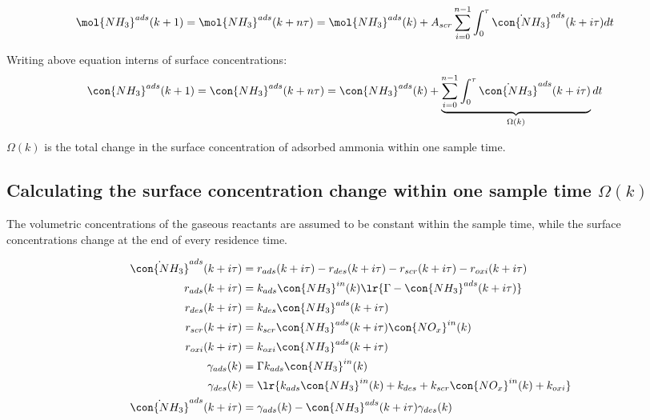 \begin{align}
    \mol{NH_3}^{ads}(k + 1) = \mol{NH_3}^{ads} (k + n\tau) &= \mol{NH_3}^{ads} (k) + A_{scr} \sum_{i=0}^{n-1} \int_{0}^{\tau} \dot{\con{NH_3}}^{ads} (k + i\tau) dt
\end{align}

Writing above equation interns of surface concentrations:
\begin{align}
    \con{NH_3}^{ads}(k + 1) = \con{NH_3}^{ads} (k + n\tau) &= \con{NH_3}^{ads} (k) + \underbrace{\sum_{i=0}^{n-1} \int_{0}^{\tau} \dot{\con{NH_3}}^{ads} (k + i\tau)}_{\Omega(k)}   dt
\end{align}

$\Omega(k)$ is the total change in the surface concentration of adsorbed ammonia
within one sample time.

\subsection{Calculating the surface concentration change within one sample time $\Omega(k)$}

The volumetric concentrations of the gaseous reactants are assumed to be
constant within the sample time, while the surface concentrations change at the
end of every residence time.

\begin{align*}
    \dot{\con{NH_3}}^{ads} (k + i\tau) &= r_{ads} (k + i \tau) - r_{des} (k + i \tau) - r_{scr} (k + i \tau) - r_{oxi} (k + i \tau)\\
    r_{ads} (k + i \tau) &= k_{ads} \con{NH_3}^{in}(k) \lr{\Gamma - \con{NH_3}^{ads} (k + i \tau)}\\
    r_{des} (k + i \tau) &= k_{des} \con{NH_3}^{ads}(k + i \tau)\\
    r_{scr} (k + i \tau) &= k_{scr} \con{NH_3}^{ads}(k + i \tau) \con{NO_x}^{in}(k)\\
    r_{oxi} (k + i \tau) &= k_{oxi} \con{NH_3}^{ads}(k + i \tau)\\
    \gamma_{ads} (k) &= \Gamma k_{ads} \con{NH_3}^{in}(k)\\
    \gamma_{des} (k) &= \lr{k_{ads} \con{NH_3}^{in}(k) + k_{des} + k_{scr} \con{NO_x}^{in}(k) + k_{oxi}}\\
    \dot{\con{NH_3}}^{ads} (k + i\tau) &= \gamma_{ads} (k) - \con{NH_3}^{ads} (k + i \tau) \gamma_{des} (k)
\end{align*}

